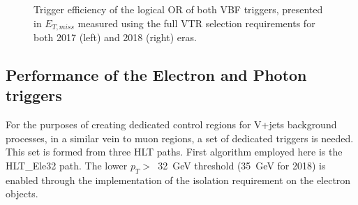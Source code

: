 \begin{figure}[htbp]
  \centering
  \caption{Trigger efficiency of the logical OR of both VBF triggers, presented in $E_{T,miss}$ measured using the full VTR selection requirements for both 2017 (left) and 2018 (right) eras.}
  \label{fig:vbf_trig_eff_final}
\end{figure}

\subsection{Performance of the Electron and Photon triggers}
\hspace{10pt} For the purposes of creating dedicated control regions for V+jets background processes, in a similar vein to muon regions, a set of dedicated triggers is needed. This set is formed from three HLT paths. First algorithm employed here is the HLT\_Ele32 path. The lower $p_T>$~32~GeV threshold (35~GeV for 2018) is enabled through the implementation of the isolation requirement on the electron objects.


